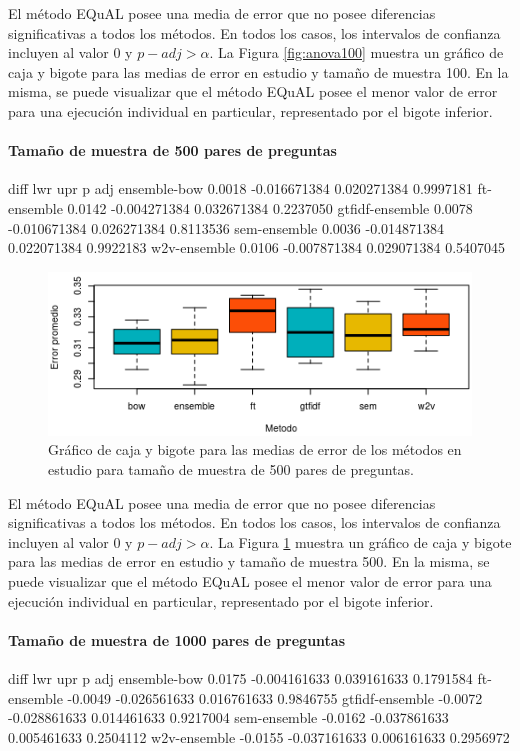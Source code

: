 \bigskip El método EQuAL posee una media de error que no posee diferencias significativas a todos los métodos. En todos los casos, los intervalos de confianza incluyen al valor 0 y \(p-adj > \alpha\). La Figura \ref{fig:anova100} muestra un gráfico de caja y bigote para las medias de error en estudio y tamaño de muestra 100. En la misma, se puede visualizar que el método EQuAL posee el menor valor de error para una ejecución individual en particular, representado por el bigote inferior.

\bigskip
\paragraph{Tamaño de muestra de 500 pares de preguntas}
\begin{rc}
                  diff          lwr         upr     p adj
ensemble-bow     0.0018 -0.016671384 0.020271384 0.9997181
ft-ensemble      0.0142 -0.004271384 0.032671384 0.2237050
gtfidf-ensemble  0.0078 -0.010671384 0.026271384 0.8113536
sem-ensemble     0.0036 -0.014871384 0.022071384 0.9922183
w2v-ensemble     0.0106 -0.007871384 0.029071384 0.5407045
\end{rc}

\begin{figure}
	\centering
	\includegraphics[width=0.7\linewidth]{10_resultados/imagenes/anova_500}
	\caption{Gráfico de caja y bigote para las medias de error de los métodos en estudio para tamaño de muestra de 500 pares de preguntas.}
	\label{fig:anova500}
\end{figure}

\bigskip El método EQuAL posee una media de error que no posee diferencias significativas a todos los métodos. En todos los casos, los intervalos de confianza incluyen al valor 0 y \(p-adj > \alpha\). La Figura \ref{fig:anova500} muestra un gráfico de caja y bigote para las medias de error en estudio y tamaño de muestra 500. En la misma, se puede visualizar que el método EQuAL posee el menor valor de error para una ejecución individual en particular, representado por el bigote inferior.

\bigskip
\paragraph{Tamaño de muestra de 1000 pares de preguntas}
\begin{rc}
                  diff          lwr         upr     p adj
ensemble-bow     0.0175 -0.004161633 0.039161633 0.1791584
ft-ensemble     -0.0049 -0.026561633 0.016761633 0.9846755
gtfidf-ensemble -0.0072 -0.028861633 0.014461633 0.9217004
sem-ensemble    -0.0162 -0.037861633 0.005461633 0.2504112
w2v-ensemble    -0.0155 -0.037161633 0.006161633 0.2956972
\end{rc}

